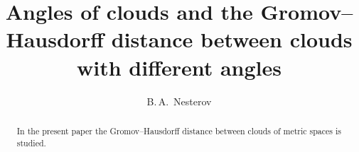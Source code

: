 \documentclass[leqno]{article}
\begin{document}
\title{Angles of clouds and the Gromov--Hausdorff distance between
  clouds with different angles
}
\author{B.\,A.~Nesterov}
\date{}
\maketitle
\begin{abstract}
  In the present paper the Gromov--Hausdorff distance between clouds
  of metric spaces is studied.
\end{abstract}
\end{document}
